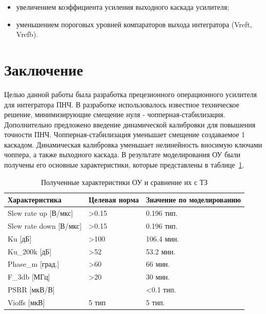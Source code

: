 \documentclass[a4paper,12pt,oneside]{scrartcl}
\begin{document}
\begin{itemize}
    \item увеличением коэффициента усиления выходного каскада усилителя;
    \item уменьшением пороговых уровней компараторов выхода интегратора (Vreft, Vrefb).
\end{itemize}


\clearpage












\section{Заключение}

Целью данной работы была разработка прецезионного операционного усилителя для интегратора ПНЧ. В разработке использовалось известное техническое решение, минимизирующие смещение нуля - чопперная-стабилизация. Дополнительно предложено введение динамической калибровки для повышения точности ПНЧ. Чопперная-стабилизация уменьшает смещение создаваемое 1 каскадом. Динамическая калибровка уменьшает нелинейность вносимую ключами чоппера, а также выходного каскада. В результате моделирования ОУ были получены его основные характеристики, которые представлены в таблице~\ref{comp}.

\begin{table}[!htb]
\centering
\caption{Полученные характеристики ОУ и сравнение их с ТЗ}
\label{comp}
\begin{tabular}{|l|l|l|}
\hline
Характеристика             & Целевая норма     & Значение по моделированию \\ \hline
Slew rate up {[}В/мкс{]}   & \textgreater 0.15 & 0.196 тип.                \\ \hline
Slew rate down {[}В/мкс{]} & \textgreater 0.15 & 0.196 тип.                \\ \hline
Ku {[}дБ{]}                & \textgreater 100  & 106.4 мин.                \\ \hline
Ku\_200k  {[}дБ{]}         & \textgreater 52   & 53.2 мин.                 \\ \hline
Phase\_m  {[}град.{]}      & \textgreater  60  & 66 мин.                   \\ \hline
F\_3db {[}МГц{]}           & \textgreater 20   & 30  мин.                  \\ \hline
PSRR {[}мкВ/В{]}           &                   & \textless 0.1 тип.        \\ \hline
Vioffs  {[}мкВ{]}          & 5 тип             & 5 тип.                    \\ \hline
\end{tabular}
\end{table}
\FloatBarrier
\end{document}
